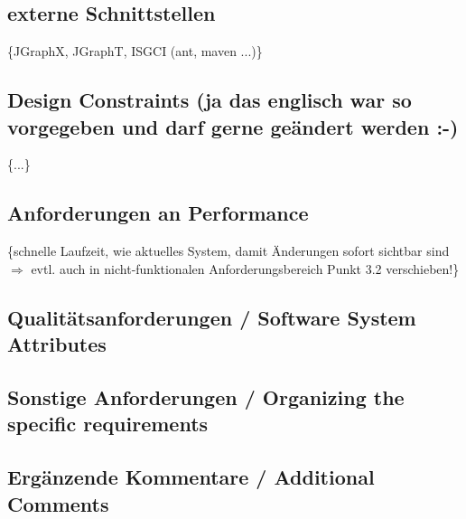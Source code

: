 \documentclass[11pt,a4paper]{article}
\begin{document}
	\subsection{externe Schnittstellen} %
	\{JGraphX, JGraphT, ISGCI (ant, maven ...)\}
	\subsection{Design Constraints (ja das englisch war so vorgegeben und darf gerne geändert werden :-)} %
	\{...\}
	\subsection{Anforderungen an Performance} %
	\{schnelle Laufzeit, wie aktuelles System, damit Änderungen sofort sichtbar sind $\Longrightarrow$ evtl. auch in nicht-funktionalen Anforderungsbereich Punkt 3.2 verschieben!\}
	\subsection{Qualitätsanforderungen / Software System Attributes} %
	\subsection{Sonstige Anforderungen / Organizing the specific requirements} %
	\subsection{Ergänzende Kommentare / Additional Comments} %
\end{document}
